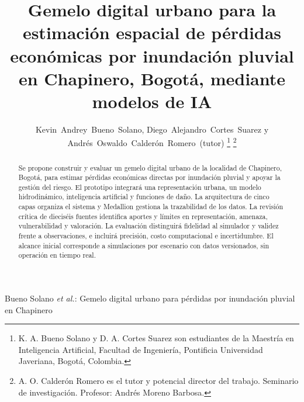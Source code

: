 \documentclass[journal]{IEEEtran}
\begin{document}
\makeatletter
\def\@seccntformat#1{\csname the#1dis\endcsname\hskip 0.5em\relax}
\makeatother

\title{Gemelo digital urbano para la estimación espacial de pérdidas económicas por inundación pluvial en Chapinero, Bogotá, mediante modelos de IA}

\author{Kevin~Andrey~Bueno~Solano, Diego~Alejandro~Cortes~Suarez y Andrés~Oswaldo~Calderón~Romero~(tutor)%
\thanks{K. A. Bueno Solano y D. A. Cortes Suarez son estudiantes de la Maestría en Inteligencia Artificial, Facultad de Ingeniería, Pontificia Universidad Javeriana, Bogotá, Colombia.}%
\thanks{A. O. Calderón Romero es el tutor y potencial director del trabajo. Seminario de investigación. Profesor: Andrés Moreno Barbosa.}}

%
{Bueno Solano \emph{et al.}: Gemelo digital urbano para pérdidas por inundación pluvial en Chapinero}

\maketitle

\begin{abstract}
Se propone construir y evaluar un gemelo digital urbano de la localidad de Chapinero, Bogotá, para estimar pérdidas económicas directas por inundación pluvial y apoyar la gestión del riesgo. El prototipo integrará una representación urbana, un modelo hidrodinámico, inteligencia artificial y funciones de daño. La arquitectura de cinco capas organiza el sistema y Medallion gestiona la trazabilidad de los datos. La revisión crítica de dieciséis fuentes identifica aportes y límites en representación, amenaza, vulnerabilidad y valoración. La evaluación distinguirá fidelidad al simulador y validez frente a observaciones, e incluirá precisión, costo computacional e incertidumbre. El alcance inicial corresponde a simulaciones por escenario con datos versionados, sin operación en tiempo real.
\end{abstract}
\end{document}
